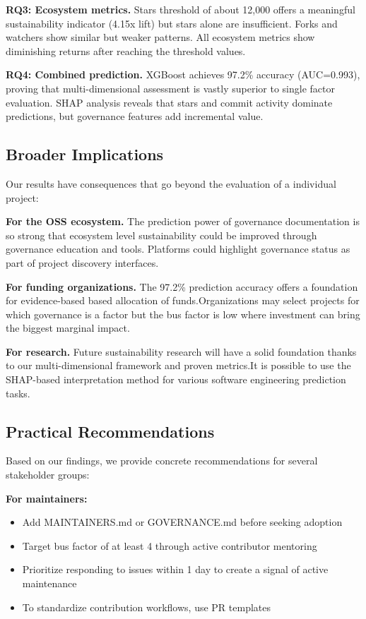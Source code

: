 \documentclass[conference]{IEEEtran}
\begin{document}
\textbf{RQ3: Ecosystem metrics.} Stars threshold of about 12,000 offers a meaningful sustainability indicator (4.15x lift) but stars alone are insufficient. Forks and watchers show similar but weaker patterns. All ecosystem metrics show diminishing returns after reaching the threshold values.

\textbf{RQ4: Combined prediction.} XGBoost achieves 97.2\% accuracy (AUC=0.993), proving that multi-dimensional assessment is vastly superior to single factor evaluation. SHAP analysis reveals that stars and commit activity dominate predictions, but governance features add incremental value.

\subsection{Broader Implications}

 Our results have consequences that go beyond the evaluation of a individual project:

\textbf{For the OSS ecosystem.} The prediction power of governance documentation is so strong that ecosystem level sustainability could be improved through governance education and tools. Platforms could highlight governance status as part of project discovery interfaces.

\textbf{For funding organizations.} The 97.2\% prediction accuracy offers a foundation for evidence-based  based allocation of funds.Organizations may select projects for which governance is a factor but the bus factor is low where investment can bring the biggest marginal impact.

\textbf{For research.}  Future sustainability research will have a solid foundation thanks to our multi-dimensional framework and proven metrics.It is possible to use the SHAP-based interpretation method for various software engineering prediction tasks.

\subsection{Practical Recommendations}

Based on our findings, we provide concrete recommendations for several stakeholder groups:

\textbf{For maintainers:}
\begin{itemize}
    \item Add MAINTAINERS.md or GOVERNANCE.md before seeking adoption
    \item Target bus factor of at least 4 through active contributor mentoring
    \item Prioritize responding to issues within 1 day to create a signal of active maintenance
    \item To standardize contribution workflows, use PR templates
\end{itemize}
\end{document}
